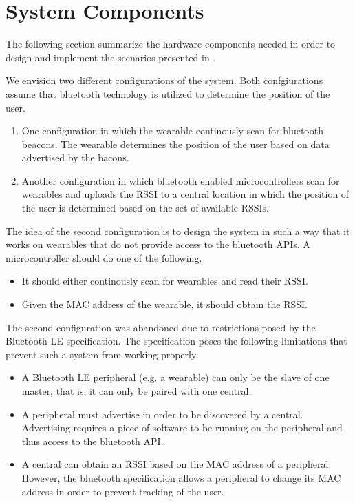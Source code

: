 \section{System Components}
\label{sec:analysis:system-components}

The following section summarize the hardware components needed in order to design and implement the scenarios presented in .

We envision two different configurations of the system. Both confgiurations assume that bluetooth technology is utilized to determine the position of the user. 

\begin{enumerate}
\item One configuration in which the wearable continously scan for bluetooth beacons. The wearable determines the position of the user based on data advertised by the bacons.
\item Another configuration in which bluetooth enabled microcontrollers scan for wearables and uploads the RSSI to a central location in which the position of the user is determined based on the set of available RSSIs.
\end{enumerate}

The idea of the second configuration is to design the system in such a way that it works on wearables that do not provide access to the bluetooth APIs. A microcontroller should do one of the following.

\begin{itemize}
\item It should either continously scan for wearables and read their RSSI.
\item Given the MAC address of the wearable, it should obtain the RSSI.
\end{itemize}

The second configuration was abandoned due to restrictions posed by the Bluetooth LE specification. The specification poses the following limitations that prevent such a system from working properly.

\begin{itemize}
\item A Bluetooth LE peripheral (e.g. a wearable) can only be the slave of one master, that is, it can only be paired with one central.
\item A peripheral must advertise in order to be discovered by a central. Advertising requires a piece of software to be running on the peripheral and thus access to the bluetooth API.
\item A central can obtain an RSSI based on the MAC address of a peripheral. However, the bluetooth specification allows a peripheral to change its MAC address in order to prevent tracking of the user\cite[p.~91]{bluetooth2010bluetooth_vol_1}.
\end{itemize}

